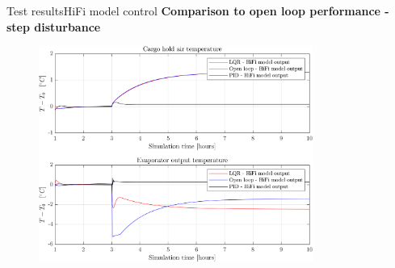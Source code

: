 \begin{frame}{Test results}{HiFi model control}
	\textbf{Comparison to open loop performance - step disturbance}
	\begin{figure}[H]
		\centering
		\includegraphics[width=0.8\textwidth]{../Graphics/fig_LQRvsKresten_stepDist_OL_zoom.png}
	\end{figure} 
\end{frame}

